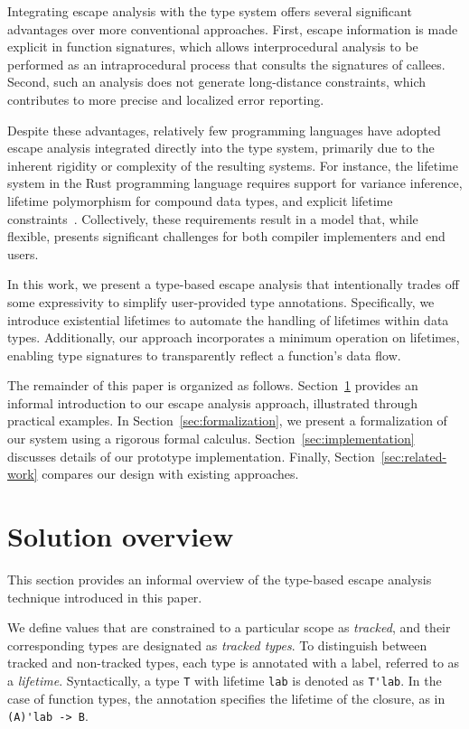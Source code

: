 \documentclass[11pt]{article}
\begin{document}
    Integrating escape analysis with the type system offers several significant advantages over more conventional approaches.
    First, escape information is made explicit in function signatures, which allows interprocedural analysis to be performed as an intraprocedural process that consults the signatures of callees.
    Second, such an analysis does not generate long-distance constraints, which contributes to more precise and localized error reporting.

    Despite these advantages, relatively few programming languages have adopted escape analysis integrated directly into the type system, primarily due to the inherent rigidity or complexity of the resulting systems.
    For instance, the lifetime system in the Rust programming language requires support for variance inference, lifetime polymorphism for compound data types, and explicit lifetime constraints~\cite{matsakis2014rust}.
    Collectively, these requirements result in a model that, while flexible, presents significant challenges for both compiler implementers and end users.

    In this work, we present a type-based escape analysis that intentionally trades off some expressivity to simplify user-provided type annotations.
    Specifically, we introduce existential lifetimes to automate the handling of lifetimes within data types.
    Additionally, our approach incorporates a minimum operation on lifetimes, enabling type signatures to transparently reflect a function's data flow.

    The remainder of this paper is organized as follows.
    Section~\ref{sec:overview} provides an informal introduction to our escape analysis approach, illustrated through practical examples.
    In Section~\ref{sec:formalization}, we present a formalization of our system using a rigorous formal calculus.
    Section~\ref{sec:implementation} discusses details of our prototype implementation.
    Finally, Section~\ref{sec:related-work} compares our design with existing approaches.


    \section{Solution overview} \label{sec:overview}

    This section provides an informal overview of the type-based escape analysis technique introduced in this paper.

    We define values that are constrained to a particular scope as \textit{tracked}, and their corresponding types are designated as \textit{tracked types}.
    To distinguish between tracked and non-tracked types, each type is annotated with a label, referred to as a \textit{lifetime}.
    Syntactically, a type \lstinline[language=colang]|T| with lifetime \lstinline[language=colang]|lab| is denoted as \lstinline[language=colang]{T'lab}.
    In the case of function types, the annotation specifies the lifetime of the closure, as in \lstinline[language=colang]{(A)'lab -> B}.
\end{document}
